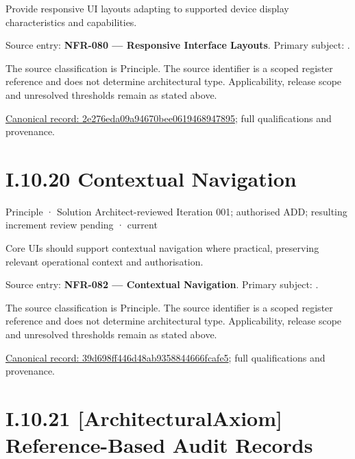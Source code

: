 Provide responsive UI layouts adapting to supported device display characteristics and capabilities.



Source entry: \textbf{NFR-080 — Responsive Interface Layouts}. Primary subject: \texttt{}.



The source classification is Principle. The source identifier is a scoped register reference and does not determine architectural type. Applicability, release scope and unresolved thresholds remain as stated above.


{\footnotesize \href{../../../../../../../continuum/motivation/principle/2e276eda09a94670bee0619468947895.md}{Canonical record: 2e276eda09a94670bee0619468947895}; full qualifications and provenance.}\par
\section*{I.10.20 Contextual Navigation}
\label{navigation:I.10.20}

\label{element:39d698ff446d48ab9358844666fcafe5}
{\small Principle · Solution Architect-reviewed Iteration 001; authorised ADD; resulting increment review pending · current}\par

Core UIs should support contextual navigation where practical, preserving relevant operational context and authorisation.



Source entry: \textbf{NFR-082 — Contextual Navigation}. Primary subject: \texttt{}.



The source classification is Principle. The source identifier is a scoped register reference and does not determine architectural type. Applicability, release scope and unresolved thresholds remain as stated above.


{\footnotesize \href{../../../../../../../continuum/motivation/principle/39d698ff446d48ab9358844666fcafe5.md}{Canonical record: 39d698ff446d48ab9358844666fcafe5}; full qualifications and provenance.}\par
\section*{I.10.21 [ArchitecturalAxiom] Reference-Based Audit Records}
\label{navigation:I.10.21}

